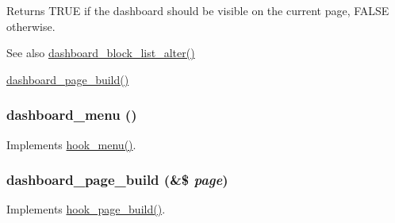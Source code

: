 \begin{DoxyReturn}{Returns}
TRUE if the dashboard should be visible on the current page, FALSE otherwise.
\end{DoxyReturn}
\begin{DoxySeeAlso}{See also}
\hyperlink{dashboard_8module_a8eb99c8e9edd83aab44177f65e1c78b1}{dashboard\_\-block\_\-list\_\-alter()} 

\hyperlink{dashboard_8module_a2fb8f282cd5d5c75158550690d39dc5d}{dashboard\_\-page\_\-build()} 
\end{DoxySeeAlso}
\hypertarget{dashboard_8module_a68af4d617d1fce11a414953a1f78f80b}{
\subsubsection[{dashboard\_\-menu}]{\setlength{\rightskip}{0pt plus 5cm}dashboard\_\-menu ()}}
\label{dashboard_8module_a68af4d617d1fce11a414953a1f78f80b}
Implements \hyperlink{group__hooks_ga5c95244fea59b25666e409759e133ded}{hook\_\-menu()}. \hypertarget{dashboard_8module_a2fb8f282cd5d5c75158550690d39dc5d}{
\subsubsection[{dashboard\_\-page\_\-build}]{\setlength{\rightskip}{0pt plus 5cm}dashboard\_\-page\_\-build (\&\$ {\em page})}}
\label{dashboard_8module_a2fb8f282cd5d5c75158550690d39dc5d}
Implements \hyperlink{group__hooks_ga16d8d8ae818dc759bbe539e16ff5b93b}{hook\_\-page\_\-build()}.

